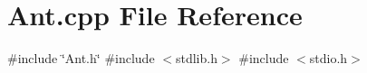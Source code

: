 \section{Ant.\+cpp File Reference}
\label{Ant_8cpp}
{\ttfamily \#include \char`\"{}Ant.\+h\char`\"{}}\newline
{\ttfamily \#include $<$stdlib.\+h$>$}\newline
{\ttfamily \#include $<$stdio.\+h$>$}\newline
